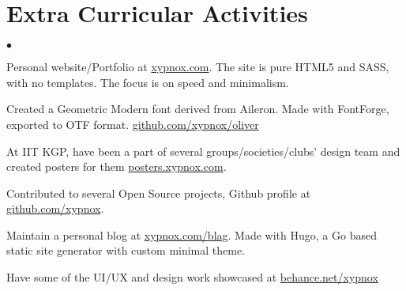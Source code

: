 \documentclass[a4paper,12pt]{extarticle} %
\begin{document}
\section{\textcolor{primary}{Extra Curricular Activities}}
\begin{list} {$\bullet$} {}
  \item {Personal website/Portfolio at \href {https://www.xypnox.com}{xypnox.com}. The site is pure HTML5 and SASS, with no templates. The focus is on speed and minimalism.}
  \item {Created a Geometric Modern font derived from Aileron. Made with FontForge, exported to OTF format. \href {https://github.com/xypnox/oliver}{github.com/xypnox/oliver} }
  \item {At IIT KGP, have been a part of several groups/societies/clubs' design team and created posters for them \href{https://posters.xypnox.com}{posters.xypnox.com}.}
  \item {Contributed to several Open Source projects, Github profile at \href {https://github.com/xypnox}{github.com/xypnox}.}
  \item { Maintain a personal blog at \href {https://www.xypnox.com/blag}{xypnox.com/blag}. Made with Hugo, a Go based static site generator with custom minimal theme.}
  \item {Have some of the UI/UX and design work showcased at \href {https://www.behance.net/xypnox}{behance.net/xypnox}}
\end{list}

\end{document}

